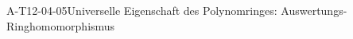 
\begin{PROP}{A-T12-04-05}{Universelle Eigenschaft des Polynomringes: Auswertungs-Ringhomomorphismus}
\end{PROP}
